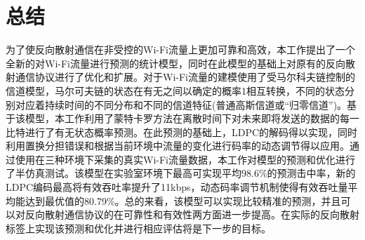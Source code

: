 
\chapter{总结}
\label{chap:conclusion}

为了使反向散射通信在非受控的Wi-Fi流量上更加可靠和高效，本工作提出了一个全新的对Wi-Fi流量进行预测的统计模型，同时在此模型的基础上对原有的反向散射通信协议进行了优化和扩展。对于Wi-Fi流量的建模使用了受马尔科夫链控制的信道模型，马尔可夫链的状态在有无之间以确定的概率1相互转换，不同的状态分别对应着持续时间的不同分布和不同的信道特征(普通高斯信道或“归零信道”)。基于该模型，本工作利用了蒙特卡罗方法在离散时间下对未来即将发送的数据的每一比特进行了有无状态概率预测。在此预测的基础上，LDPC的解码得以实现，同时利用置换分担错误和根据当前环境中流量的变化进行码率的动态调节得以应用。通过使用在三种环境下采集的真实Wi-Fi流量数据，本工作对模型的预测和优化进行了半仿真测试。该模型在实验室环境下最高可实现平均98.6\%的预测击中率，新的LDPC编码最高将有效吞吐率提升了11kbps，动态码率调节机制使得有效吞吐量平均能达到最优值的80.79\%。总的来看，该模型可以实现比较精准的预测，并且可以对反向散射通信协议的在可靠性和有效性两方面进一步提高。在实际的反向散射标签上实现该预测和优化并进行相应评估将是下一步的目标。
